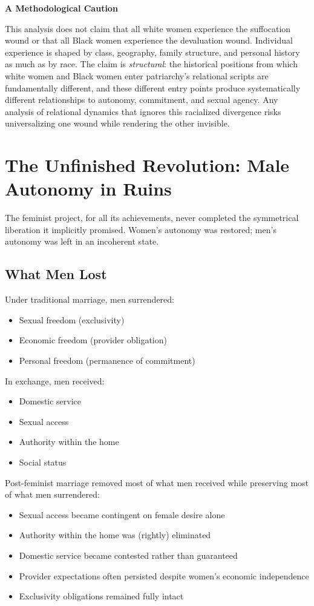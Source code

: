 \documentclass[12pt,openany]{book}
\numberwithin{equation}{chapter}
\begin{document}
\textbf{A Methodological Caution}

This analysis does not claim that all white women experience the suffocation wound or that all Black women experience the devaluation wound. Individual experience is shaped by class, geography, family structure, and personal history as much as by race. The claim is \textit{structural}: the historical positions from which white women and Black women enter patriarchy's relational scripts are fundamentally different, and these different entry points produce systematically different relationships to autonomy, commitment, and sexual agency. Any analysis of relational dynamics that ignores this racialized divergence risks universalizing one wound while rendering the other invisible.

\section{The Unfinished Revolution: Male Autonomy in Ruins}

The feminist project, for all its achievements, never completed the symmetrical liberation it implicitly promised. Women's autonomy was restored; men's autonomy was left in an incoherent state.

\subsection{What Men Lost}

Under traditional marriage, men surrendered:
\begin{itemize}
    \item Sexual freedom (exclusivity)
    \item Economic freedom (provider obligation)
    \item Personal freedom (permanence of commitment)
\end{itemize}

In exchange, men received:
\begin{itemize}
    \item Domestic service
    \item Sexual access
    \item Authority within the home
    \item Social status
\end{itemize}

Post-feminist marriage removed most of what men received while preserving most of what men surrendered:
\begin{itemize}
    \item Sexual access became contingent on female desire alone
    \item Authority within the home was (rightly) eliminated
    \item Domestic service became contested rather than guaranteed
    \item Provider expectations often persisted despite women's economic independence
    \item Exclusivity obligations remained fully intact
\end{itemize}
\end{document}
